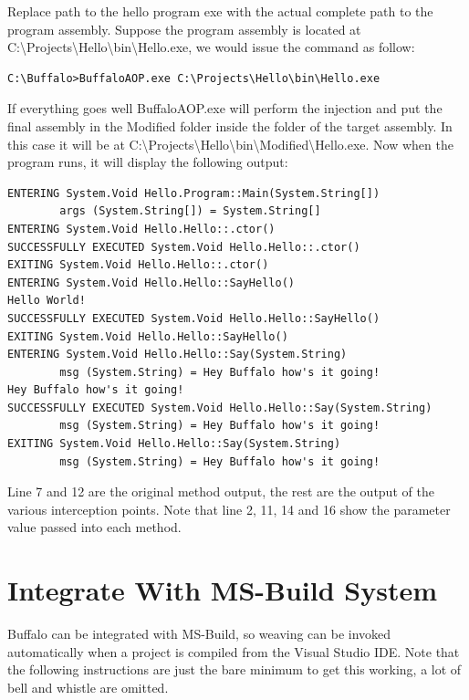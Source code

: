 Replace path to the hello program exe with the actual complete path to the program assembly. Suppose the program assembly is located at C:\textbackslash{Projects}\textbackslash{Hello}\textbackslash{bin}\textbackslash{Hello.exe}, we would issue the command as follow:

\begin{lstlisting}[caption={Invoking BuffaloAOP.exe Example}, label=buffalocmd2, frame=tb, basicstyle=\scriptsize]
C:\Buffalo>BuffaloAOP.exe C:\Projects\Hello\bin\Hello.exe
\end{lstlisting}

If everything goes well BuffaloAOP.exe will perform the injection and put the final assembly in the Modified folder inside the folder of the target assembly. In this case it will be at C:\textbackslash{Projects}\textbackslash{Hello}\textbackslash{bin}\textbackslash{Modified}\textbackslash{Hello.exe}. Now when the program runs, it will display the following output:

\begin{lstlisting}[caption={TraceAspect output}, label=traceaspectout, frame=tb, basicstyle=\scriptsize]
ENTERING System.Void Hello.Program::Main(System.String[])
        args (System.String[]) = System.String[]
ENTERING System.Void Hello.Hello::.ctor()
SUCCESSFULLY EXECUTED System.Void Hello.Hello::.ctor()
EXITING System.Void Hello.Hello::.ctor()
ENTERING System.Void Hello.Hello::SayHello()
Hello World!
SUCCESSFULLY EXECUTED System.Void Hello.Hello::SayHello()
EXITING System.Void Hello.Hello::SayHello()
ENTERING System.Void Hello.Hello::Say(System.String)
        msg (System.String) = Hey Buffalo how's it going!
Hey Buffalo how's it going!
SUCCESSFULLY EXECUTED System.Void Hello.Hello::Say(System.String)
        msg (System.String) = Hey Buffalo how's it going!
EXITING System.Void Hello.Hello::Say(System.String)
        msg (System.String) = Hey Buffalo how's it going!
\end{lstlisting}

Line 7 and 12 are the original method output, the rest are the output of the various interception points. Note that line 2, 11, 14 and 16 show the parameter value passed into each method.

\section{Integrate With MS-Build System}

Buffalo can be integrated with MS-Build, so weaving can be invoked automatically when a project is compiled from the Visual Studio IDE. Note that the following instructions are just the bare minimum to get this working, a lot of bell and whistle are omitted.

